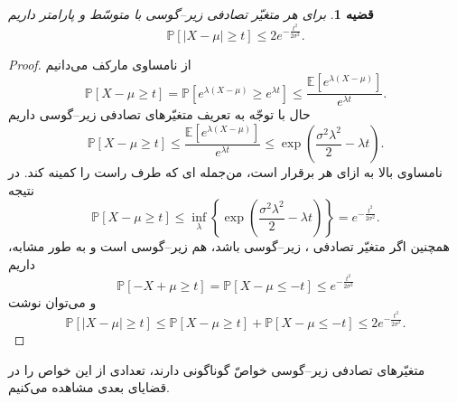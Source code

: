 \documentclass[BScThesis, onesided]{thesis}
\newtheorem{theorem}{قضیه}[chapter]
\newcommand{\E}{\mathbb{E}}
\newcommand{\Prob}{\mathbb{P}}
\newcommand{\R}{\mathbb{R}}
\begin{document}
	\begin{theorem}	\label{thm1subgaussian}
		برای هر متغیّر تصادفی زیر--گوسی 
		با متوسّط
		\lr{$\mu = \E[X]$}
		و پارامتر
		\lr{$\sigma$}
		داریم
		\begin{equation}
		\Prob[|X-\mu|\geq t] \leq 2e^{-\frac{t^2}{2\sigma^2}}.
		\end{equation}
	\end{theorem}
	\begin{proof}
		از نامساوی مارکف می‌دانیم
		\[\Prob[X-\mu\geq t] = \Prob[e^{\lambda (X-\mu)} \geq e^{\lambda t}] \leq \frac{\E\left[e^{\lambda (X-\mu)}\right]}{e^{\lambda t}}. \]
		حال با توجّه به تعریف متغیّرهای تصادفی زیر--گوسی داریم
		\[\Prob[X-\mu\geq t] \leq \frac{\E\left[e^{\lambda (X-\mu)}\right]}{e^{\lambda t}} \leq \exp(\frac{\sigma^2\lambda^2}{2} - \lambda t).\]
		نامساوی بالا به ازای هر
		\lr{$\lambda\in\R$}
		برقرار است، من‌جمله
		\lr{$\lambda$}ای
		که طرف راست را کمینه کند. در نتیجه
		\begin{equation}
		\Prob[X-\mu\geq t] \leq \inf_\lambda\left\{\exp(\frac{\sigma^2\lambda^2}{2} - \lambda t) \right\} = e^{-\frac{t^2}{2\sigma^2}}.
		\end{equation}
		همچنین اگر متغیّر تصادفی
		،
		زیر--گوسی باشد، 
		هم زیر--گوسی است و به طور مشابه، داریم
		\[\Prob[-X+\mu\geq t] = \Prob[X-\mu\leq -t]\leq  e^{-\frac{t^2}{2\sigma^2}}\]
		و می‌توان نوشت
		\[\Prob[|X-\mu|\geq t] \leq \Prob[X-\mu\geq t] + \Prob[X-\mu\leq -t] \leq 2e^{-\frac{t^2}{2\sigma^2}}.\]
		
	\end{proof}
	
	متغیّرهای تصادفی زیر--گوسی خواصّ گوناگونی دارند، تعدادی از این خواص را در قضایای بعدی مشاهده می‌کنیم.
	
\end{document}
